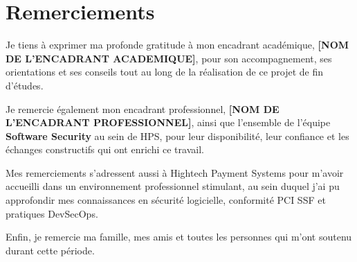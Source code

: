 \chapter*{Remerciements}

Je tiens à exprimer ma profonde gratitude à mon encadrant académique, \textbf{[NOM DE L'ENCADRANT ACADEMIQUE]}, pour son accompagnement, ses orientations et ses conseils tout au long de la réalisation de ce projet de fin d'études.

Je remercie également mon encadrant professionnel, \textbf{[NOM DE L'ENCADRANT PROFESSIONNEL]}, ainsi que l'ensemble de l'équipe \textbf{Software Security} au sein de HPS, pour leur disponibilité, leur confiance et les échanges constructifs qui ont enrichi ce travail.

Mes remerciements s'adressent aussi à Hightech Payment Systems pour m'avoir accueilli dans un environnement professionnel stimulant, au sein duquel j'ai pu approfondir mes connaissances en sécurité logicielle, conformité PCI SSF et pratiques DevSecOps.

Enfin, je remercie ma famille, mes amis et toutes les personnes qui m'ont soutenu durant cette période.

\clearpage
